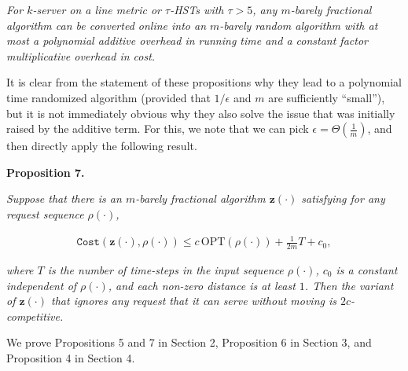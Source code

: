 \documentclass[10pt,a4paper]{article}
\begin{document}
\emph{For $k$-server on a line metric
or $\tau$-HSTs with $\tau>5$, any $m$-barely fractional algorithm can be converted online into an $m$-barely random algorithm with at most a polynomial additive overhead in running time and a constant factor multiplicative overhead in cost.}\par






It is clear from the statement of these propositions why they lead to a polynomial time randomized algorithm (provided that $1/\epsilon$ and $m$ are sufficiently “small”), but it is not immediately obvious why they also solve the issue that was initially raised by the additive term. For this, we note that we can pick $\epsilon=\Theta\left(\frac{1}{m}\right)$, and then directly apply the following result.\par





\par\medskip\noindent\textbf{
\textbf{Proposition 7}\textbf{.}
}\par



\emph{Suppose that there is an $m$-barely fractional algorithm ${\mathbf{z}}(\cdot)$ satisfying for any request sequence $\rho(\cdot)$,}\par


\[\begin{gathered}
{\texttt{Cost}}({\mathbf{z}}(\cdot),\rho(\cdot))\leq c\,{\text{OPT}}(\rho(\cdot))+\frac{1}{2m}T+c_{0},
\end{gathered}\]


\emph{where $T$ is the number of time-steps in the input sequence $\rho(\cdot)$, $c_{0}$ is a constant independent of $\rho(\cdot)$, and each non-zero distance is at least $1$. Then the variant of ${\mathbf{z}}(\cdot)$ that ignores any request that it can serve without moving is $2c$-competitive.}\par






We prove Propositions 5 and 7 in Section 2, Proposition 6 in Section 3, and Proposition 4 in Section 4.\par
\end{document}
